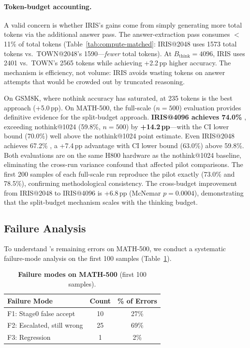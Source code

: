 \paragraph{Token-budget accounting.}
A valid concern is whether IRIS's gains come from simply generating more total tokens via the additional answer pass.
The answer-extraction pass consumes $<$11\% of total tokens (Table~\ref{tab:compute-matched}: IRIS@2048 uses 1573 total tokens vs.\ TOWN@2048's 1590---\emph{fewer} total tokens).
At $B_{\text{think}}{=}4096$, IRIS uses 2401 vs.\ TOWN's 2565 tokens while achieving +2.2\,pp higher accuracy.
The mechanism is efficiency, not volume: IRIS avoids wasting tokens on answer attempts that would be crowded out by truncated reasoning.

On GSM8K, where nothink accuracy has saturated, \method{} at 235 tokens is the best approach (+5.0\,pp).
On MATH-500, the full-scale ($n{=}500$) evaluation provides definitive evidence for the split-budget approach.
\textbf{IRIS@4096 achieves 74.0\% }, exceeding nothink@1024 (59.8\%, $n{=}500$) by \textbf{+14.2\,pp}---with the CI lower bound (70.0\%) well above the nothink@1024 point estimate.
Even IRIS@2048 achieves 67.2\% , a +7.4\,pp advantage with CI lower bound (63.0\%) above 59.8\%.
Both evaluations are on the same H800 hardware as the nothink@1024 baseline, eliminating the cross-run variance confound that affected pilot comparisons.
The first 200 samples of each full-scale run reproduce the pilot exactly (73.0\% and 78.5\%), confirming methodological consistency.
The cross-budget improvement from IRIS@2048 to IRIS@4096 is +6.8\,pp (McNemar $p{=}0.0004$), demonstrating that the split-budget mechanism scales with the thinking budget.

\subsection{Failure Analysis}
\label{sec:experiments:failure}

To understand \method{}'s remaining errors on MATH-500, we conduct a systematic
failure-mode analysis on the first 100 samples (Table~\ref{tab:failure-modes}).

\begin{table}[t]
\centering
\caption{\textbf{Failure modes on MATH-500} (first 100 samples).}
\label{tab:failure-modes}
\begin{tabular}{lcc}
\toprule
\textbf{Failure Mode} & \textbf{Count} & \textbf{\% of Errors} \\
\midrule
F1: Stage0 false accept & 10 & 27\% \\
F2: Escalated, still wrong & 25 & 69\% \\
F3: Regression & 1 & 2\% \\
\bottomrule
\end{tabular}
\end{table}

